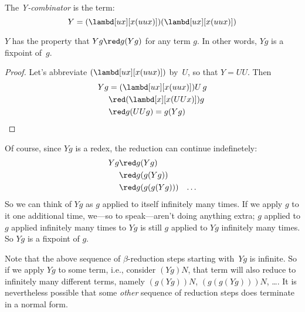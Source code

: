 \documentclass[../../../include/open-logic-section]{subfiles}
\begin{document}
\begin{defn}
  The \emph{Y-combinator} is the term:
  \[
  Y = (\lambd[ux][x(uux)])(\lambd[ux][x(uux)])
  \]
\end{defn}

\begin{prop}
  $Y$ has the property that $Yg \red g(Yg)$ for any term $g$. In other
  words, $Yg$ is a fixpoint of~$g$.
\end{prop}

\begin{proof}
  Let's abbreviate $(\lambd[ux][x(uux)])$ by~$U$, so that $Y = UU$. Then
  \begin{align*}
    Y g &= (\lambd[ux][x(uux)])U\,g \\
    &\red (\lambd[x][x(UUx)])g\\
    & \red g(UUg) = g(Yg) \qedhere
  \end{align*}
\end{proof}

Of course, since $Yg$ is a redex, the reduction can continue indefinetely:
\begin{align*}
  Y g &\red g (Y g) \\
    &\red g (g (Y g)) \\
    &\red g(g (g (Y g)))
    &\ldots
\end{align*}
So we can think of $Yg$ as $g$ applied to itself infinitely many
times. If we apply $g$ to it one additional time, we---so to
speak---aren't doing anything extra; $g$ applied to $g$ applied
infinitely many times to $Yg$ is still $g$ applied to $Yg$ infinitely
many times. So $Yg$ is a fixpoint of $g$.

Note that the above sequence of $\beta$-reduction steps starting
with~$Yg$ is infinite. So if we apply $Yg$ to some term, i.e.,
consider $(Yg)N$, that term will also reduce to infinitely many
different terms, namely $(g(Yg))N$, $(g(g(Yg)))N$, \dots. It is
nevertheless possible that some \emph{other} sequence of reduction
steps does terminate in a normal form.
\end{document}
